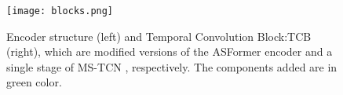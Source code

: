 \begin{figure}
\centering
\texttt{[image: blocks.png]}
\caption{Encoder structure (left) and Temporal Convolution Block:TCB (right), which are modified versions of the ASFormer \cite{yi2021asformer} encoder and a single stage of MS-TCN \cite{farha2019ms}, respectively. The components added are in green color. }
\label{fig:comp} 
\end{figure}